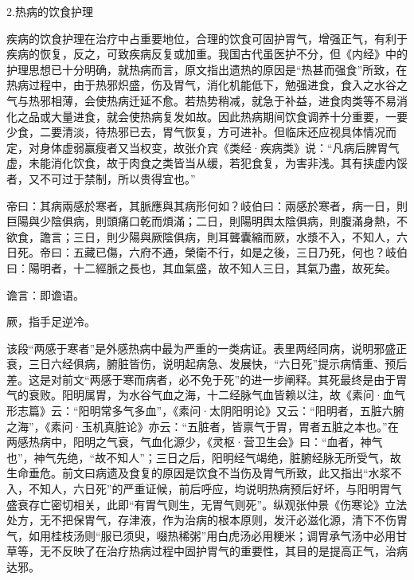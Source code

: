 \documentclass[draft,12pt]{ctexbook}
\begin{document}
2.热病的饮食护理

疾病的饮食护理在治疗中占重要地位，合理的饮食可固护胃气，增强正气，有利于疾病的恢复，反之，可致疾病反复或加重。我国古代虽医护不分，但《内经》中的护理思想已十分明确，就热病而言，原文指出遗热的原因是“热甚而强食”所致，在热病过程中，由于热邪炽盛，伤及胃气，消化机能低下，勉强进食，食入之水谷之气与热邪相薄，会使热病迁延不愈。若热势稍减，就急于补益，进食肉类等不易消化之品或大量进食，就会使热病复发如故。因此热病期间饮食调养十分重要，一要少食，二要清淡，待热邪已去，胃气恢复，方可进补。但临床还应视具体情况而定，对身体虚弱赢瘦者又当权变，故张介宾《类经·疾病类》说：“凡病后脾胃气虚，未能消化饮食，故于肉食之类皆当从缓，若犯食复，为害非浅。其有挟虚内馁者，又不可过于禁制，所以贵得宜也。”


\begin{yuanwen}
帝曰：其病兩感於寒者，其脈應與其病形何如？岐伯曰：兩感於寒者，病一日，則巨陽與少陰俱病，則頭痛口乾而煩滿；二日，則陽明舆太陰俱病，則腹滿身熱，不欲食，譫言；三日，則少陽與厥陰俱病，則耳聾囊縮而厥，水漿不入，不知人，六日死。帝曰：五藏已傷，六府不通，榮衛不行，如是之後，三日乃死，何也？岐伯曰：陽明者，十二經脈之長也，其血氣盛，故不知人三日，其氣乃盡，故死矣。
\end{yuanwen}


\begin{jiaozhu}
  \item 谵言：即谵语。
  \item 厥，指手足逆冷。
\end{jiaozhu}



该段“两感于寒者”是外感热病中最为严重的一类病证。表里两经同病，说明邪盛正衰，三日六经俱病，腑脏皆伤，说明起病急、发展快，“六日死”提示病情重、预后差。这是对前文“两感于寒而病者，必不免于死”的进一步阐释。其死最终是由于胃气的衰败。阳明属胃，为水谷气血之海，十二经脉气血皆赖以注，故《素问·血气形志篇》云：“阳明常多气多血”，《素问·太阴阳明论》又云：“阳明者，五脏六腑之海”，《素问·玉机真脏论》亦云：“五脏者，皆禀气于胃，胃者五脏之本也。”在两感热病中，阳明之气衰，气血化源少，《灵枢·营卫生会》曰：“血者，神气也”，神气先绝，“故不知人”；三日之后，阳明经气竭绝，脏腑经脉无所受气，故生命垂危。前文曰病遗及食复的原因是饮食不当伤及胃气所致，此又指出“水浆不入，不知人，六日死”的严重证候，前后呼应，均说明热病预后好坏，与阳明胃气盛衰存亡密切相关，此即“有胃气则生，无胃气则死”。纵观张仲景《伤寒论》立法处方，无不把保胃气，存津液，作为治病的根本原则，发汗必滋化源，清下不伤胃气，如用桂枝汤则“服已须臾，啜热稀粥”用白虎汤必用粳米；调胃承气汤中必用甘草等，无不反映了在治疗热病过程中固护胃气的重要性，其目的是提高正气，治病达邪。
\end{document}
